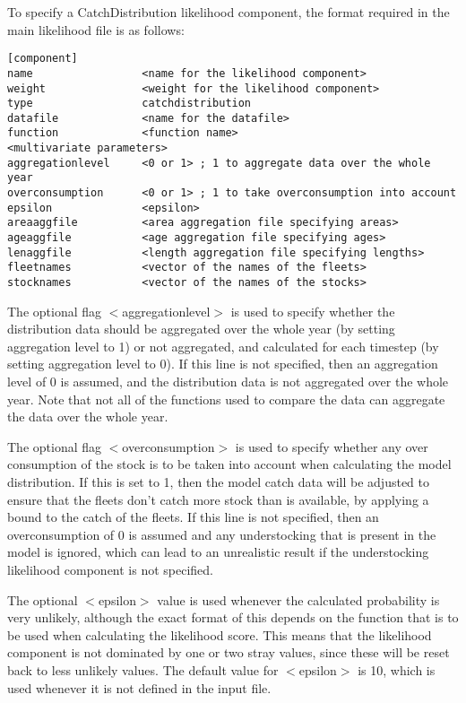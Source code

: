 \documentclass[10pt,twoside]{book}
\begin{document}
\bigskip
To specify a CatchDistribution likelihood component, the format required in the main likelihood file is as follows:

{\small\begin{verbatim}
[component]
name                 <name for the likelihood component>
weight               <weight for the likelihood component>
type                 catchdistribution
datafile             <name for the datafile>
function             <function name>
<multivariate parameters>
aggregationlevel     <0 or 1> ; 1 to aggregate data over the whole year
overconsumption      <0 or 1> ; 1 to take overconsumption into account
epsilon              <epsilon>
areaaggfile          <area aggregation file specifying areas>
ageaggfile           <age aggregation file specifying ages>
lenaggfile           <length aggregation file specifying lengths>
fleetnames           <vector of the names of the fleets>
stocknames           <vector of the names of the stocks>
\end{verbatim}}

The optional flag $<$aggregationlevel$>$ is used to specify whether the distribution data should be aggregated over the whole year (by setting aggregation level to 1) or not aggregated, and calculated for each timestep (by setting aggregation level to 0).  If this line is not specified, then an aggregation level of 0 is assumed, and the distribution data is not aggregated over the whole year.  Note that not all of the functions used to compare the data can aggregate the data over the whole year.

\bigskip
The optional flag $<$overconsumption$>$ is used to specify whether any over consumption of the stock is to be taken into account when calculating the model distribution.  If this is set to 1, then the model catch data will be adjusted to ensure that the fleets don't catch more stock than is available, by applying a bound to the catch of the fleets.  If this line is not specified, then an overconsumption of 0 is assumed and any understocking that is present in the model is ignored, which can lead to an unrealistic result if the understocking likelihood component is not specified.

\bigskip
The optional $<$epsilon$>$ value is used whenever the calculated probability is very unlikely, although the exact format of this depends on the function that is to be used when calculating the likelihood score.  This means that the likelihood component is not dominated by one or two stray values, since these will be reset back to less unlikely values.  The default value for $<$epsilon$>$ is 10, which is used whenever it is not defined in the input file.
\end{document}
